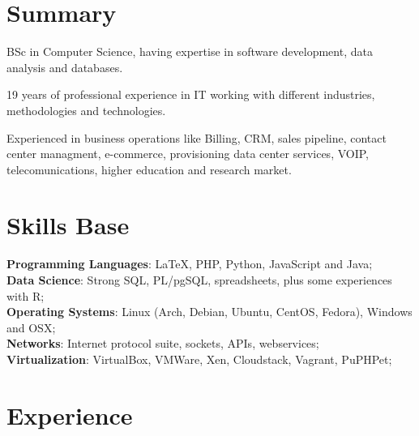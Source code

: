 \documentclass[margin]{res}
\begin{document}
  
\address{London, UK \\ 
         andre.reis@gmail.com \\ 
         Phone: +44 074 8210 1626 \\
         Linkedin: linkedin.com/in/andreleitereis \\
         Github: github.com/reis}

\begin{resume}
\section{Summary} BSc in Computer Science, having expertise in software development, 
                  data analysis and databases.
                        
                  19 years of professional experience in IT working with different industries, 
                  methodologies and technologies.
                  
                  Experienced in business operations like Billing, CRM, sales pipeline, 
                  contact center managment, e-commerce, provisioning data center services, 
                  VOIP, telecomunications, higher education and research market.

\section{Skills Base}  
  \textbf{Programming Languages}: \LaTeX , PHP, Python, JavaScript and Java;\\
  \textbf{Data Science}: Strong SQL, PL/pgSQL, spreadsheets, plus some experiences with R;\\
  \textbf{Operating Systems}:  Linux (Arch, Debian, Ubuntu, CentOS, Fedora), Windows and OSX;\\
  \textbf{Networks}: Internet protocol suite, sockets, APIs, webservices; \\
  \textbf{Virtualization}: VirtualBox, VMWare, Xen, Cloudstack, Vagrant, PuPHPet;\\
                                  

\section{Experience}


\end{resume}
\end{document}

